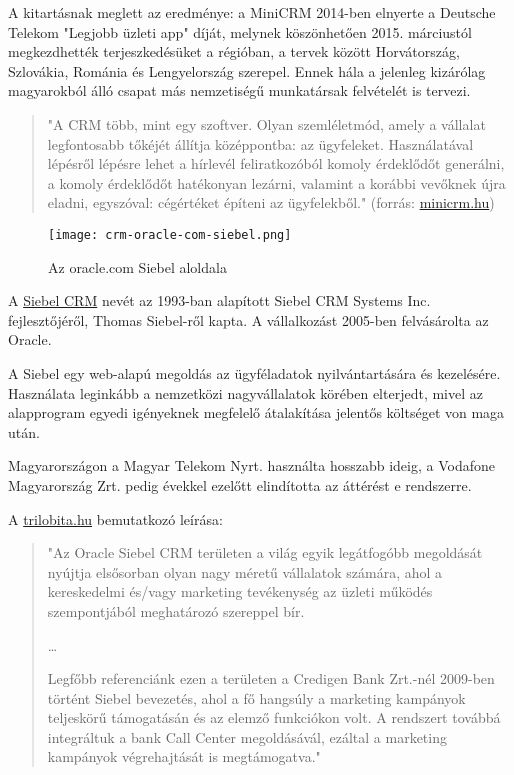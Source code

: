 A kitartásnak meglett az eredménye: a MiniCRM 2014-ben elnyerte a Deutsche Telekom "Legjobb üzleti app" díját, melynek köszönhetően 2015. márciustól megkezdhették terjeszkedésüket a régióban, a tervek között Horvátország, Szlovákia, Románia és Lengyelország szerepel. Ennek hála a jelenleg kizárólag magyarokból álló csapat más nemzetiségű munkatársak felvételét is tervezi.

\begin{quote}
"A CRM több, mint egy szoftver. Olyan szemléletmód, amely a vállalat legfontosabb tőkéjét állítja középpontba: az ügyfeleket. Használatával lépésről lépésre lehet a hírlevél feliratkozóból komoly érdeklődőt generálni, a komoly érdeklődőt hatékonyan lezárni, valamint a korábbi vevőknek újra eladni, egyszóval: cégértéket építeni az ügyfelekből." (forrás: \href{http://www.minicrm.hu/tour/crm/}{minicrm.hu})
\end{quote}

\newpage


\begin{figure}
	\texttt{[image: crm-oracle-com-siebel.png]}
	\caption{Az oracle.com Siebel aloldala}
\end{figure}

A \href{http://www.oracle.com/siebel}{Siebel CRM} nevét az 1993-ban alapított Siebel CRM Systems Inc. fejlesztőjéről, Thomas Siebel-ről kapta. A vállalkozást 2005-ben felvásárolta az Oracle.

A Siebel egy web-alapú megoldás az ügyféladatok nyilvántartására és kezelésére. Használata leginkább a nemzetközi nagyvállalatok körében elterjedt, mivel az alapprogram egyedi igényeknek megfelelő átalakítása jelentős költséget von maga után.

Magyarországon a Magyar Telekom Nyrt. használta hosszabb ideig, a Vodafone Magyarország Zrt. pedig évekkel ezelőtt elindította az áttérést e rendszerre.

A \href{http://www.trilobita.hu/termekek/viszonteladott-termekek/oracle-alkalmazasok/oracle-siebel-crm}{trilobita.hu} bemutatkozó leírása:

\begin{quote}
"Az Oracle Siebel CRM területen a világ egyik legátfogóbb megoldását nyújtja elsősorban olyan nagy méretű vállalatok számára, ahol a kereskedelmi és/vagy marketing tevékenység az üzleti működés szempontjából meghatározó szereppel bír.

\dots

Legfőbb referenciánk ezen a területen a Credigen Bank Zrt.-nél 2009-ben történt Siebel bevezetés, ahol a fő hangsúly a marketing kampányok teljeskörű támogatásán és az elemző funkciókon volt. A rendszert továbbá integráltuk a bank Call Center megoldásávál, ezáltal  a marketing kampányok végrehajtását is megtámogatva."
\end{quote}


